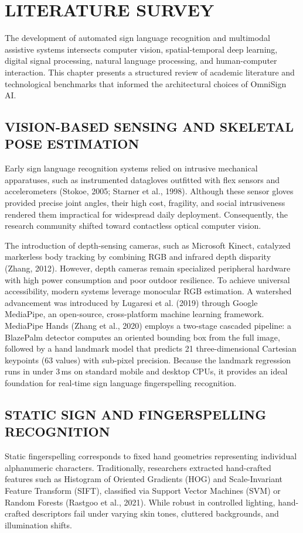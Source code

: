 \documentclass[12pt,a4paper]{report}
\begin{document}
\chapter{LITERATURE SURVEY} \label{chap:lit}
The development of automated sign language recognition and multimodal assistive systems intersects computer vision, spatial-temporal deep learning, digital signal processing, natural language processing, and human-computer interaction. This chapter presents a structured review of academic literature and technological benchmarks that informed the architectural choices of OmniSign AI.

\section{VISION-BASED SENSING AND SKELETAL POSE ESTIMATION} \label{sec:lit-pose}
Early sign language recognition systems relied on intrusive mechanical apparatuses, such as instrumented datagloves outfitted with flex sensors and accelerometers (Stokoe, 2005; Starner et al., 1998). Although these sensor gloves provided precise joint angles, their high cost, fragility, and social intrusiveness rendered them impractical for widespread daily deployment. Consequently, the research community shifted toward contactless optical computer vision.

The introduction of depth-sensing cameras, such as Microsoft Kinect, catalyzed markerless body tracking by combining RGB and infrared depth disparity (Zhang, 2012). However, depth cameras remain specialized peripheral hardware with high power consumption and poor outdoor resilience. To achieve universal accessibility, modern systems leverage monocular RGB estimation. A watershed advancement was introduced by Lugaresi et al. (2019) through Google MediaPipe, an open-source, cross-platform machine learning framework. MediaPipe Hands (Zhang et al., 2020) employs a two-stage cascaded pipeline: a BlazePalm detector computes an oriented bounding box from the full image, followed by a hand landmark model that predicts 21 three-dimensional Cartesian keypoints ($63$ values) with sub-pixel precision. Because the landmark regression runs in under 3\,ms on standard mobile and desktop CPUs, it provides an ideal foundation for real-time sign language fingerspelling recognition.

\section{STATIC SIGN AND FINGERSPELLING RECOGNITION} \label{sec:lit-static}
Static fingerspelling corresponds to fixed hand geometries representing individual alphanumeric characters. Traditionally, researchers extracted hand-crafted features such as Histogram of Oriented Gradients (HOG) and Scale-Invariant Feature Transform (SIFT), classified via Support Vector Machines (SVM) or Random Forests (Rastgoo et al., 2021). While robust in controlled lighting, hand-crafted descriptors fail under varying skin tones, cluttered backgrounds, and illumination shifts.
\end{document}

